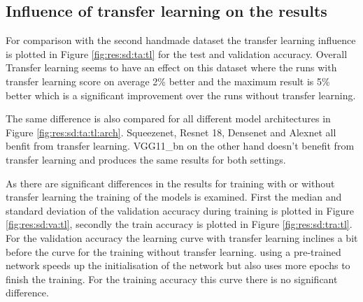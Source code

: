 	\subsection{Influence of transfer learning on the results}
		For comparison with the second handmade dataset the transfer learning influence is plotted in Figure \ref{fig:res:sd:ta:tl} for the test and validation accuracy. Overall Transfer learning seems to have an effect on this dataset where the runs with transfer learning score on average 2\% better and the maximum result is 5\% better which is a significant improvement over the runs without transfer learning. 
		
		The same difference is also compared for all different model architectures in Figure \ref{fig:res:sd:ta:tl:arch}. Squeezenet, Resnet 18, Densenet and Alexnet all benfit from transfer learning. VGG11\_bn on the other hand doesn't benefit from transfer learning and produces the same results for both settings.
		
		As there are significant differences in the results for training with or without transfer learning the training of the models is examined. First the median and standard deviation of the validation accuracy during training is plotted in Figure \ref{fig:res:sd:va:tl}, secondly the train accuracy is plotted in Figure \ref{fig:res:sd:tra:tl}. For the validation accuracy the learning curve with transfer learning inclines a bit before the curve for the training without transfer learning. using a pre-trained network speeds up the initialisation of the network but also uses more epochs to finish the training. For the training accuracy this curve there is no significant difference.

